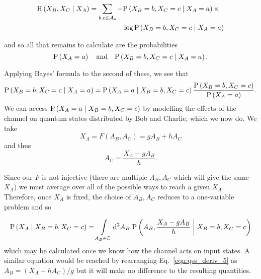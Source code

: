 \begin{align}
\text{H}\left(X_B, X_C \given X_A\right) = \sum_{b, c \in \mathcal{A}_4} - &\text{P}\left(X_B=b, X_C=c \given X_A=a\right) \times \notag \\
%
&\log \text{P}\left(X_B=b, X_C=c \given X_A=a\right)
\end{align}

\noindent and so all that remains to calculate are the probabilities \begin{equation}
\text{P}\left(X_A=a\right) \qq{and} \text{P}\left(X_B=b, X_C=c \given X_A=a\right).
\end{equation}

\noindent Applying Bayes' formula to the second of these, we see that
\begin{equation}
\text{P}\left(X_B=b, X_C=c \; \middle| \; X_A=a\right) = \text{P}\left(X_A=a \; \middle| \; X_B=b, X_C=c\right) \frac{\text{P}\left(X_B=b, X_C=c\right)}{\text{P}\left(X_A=a\right)}.
\end{equation}
We can access $\text{P}\left(X_A=a \; \middle| \; X_B=b, X_C=c\right)$ by modelling the effects of the channel on quantum states distributed by Bob and Charlie, which we now do. We take
\begin{equation}\label{eqn:qss_deriv_5}
X_A = F\left(A_B, A_C\right) = g A_B + h A_C
\end{equation}
and thus
\begin{equation}
A_C = \frac{X_A - g A_B}{h}.
\end{equation}

\noindent Since our $F$ is not injective (there are multiple $A_B, A_C$ which will give the same $X_A$) we must average over all of the possible ways to reach a given $X_A$. Therefore, once $X_A$ is fixed, the choice of $A_B, A_C$ reduces to a one-variable problem and so

\begin{equation}
\text{P}\left(X_A \; \middle| \; X_B=b, X_C=c\right) = \int\limits_{A_B \in \mathbb{C}} \mathop{}\!\mathrm{d^2} A_B \; \text{P}\left(A_B , \frac{X_A - g A_B}{h} \; \middle| \; X_B=b, X_C=c\right)
\end{equation}
which may be calculated once we know how the channel acts on input states. A similar equation would be reached by rearranging Eq.~\ref{eqn:qss_deriv_5} as $A_B = \left(X_A - h A_C\right)/g$ but it will make no difference to the resulting quantities.

